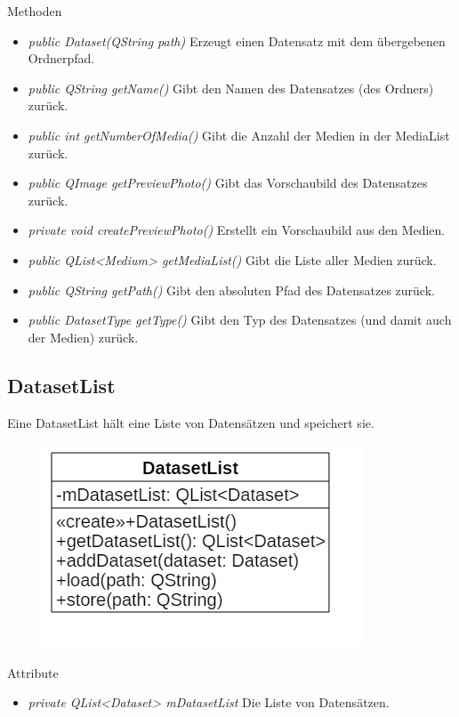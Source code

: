 Methoden
\begin{itemize}
\item \textit{public Dataset(QString path)} Erzeugt einen Datensatz mit dem übergebenen Ordnerpfad.
\item \textit{public QString getName()} Gibt den Namen des Datensatzes (des Ordners) zurück.
\item \textit{public int getNumberOfMedia()} Gibt die Anzahl der Medien in der MediaList zurück.
\item \textit{public QImage getPreviewPhoto()} Gibt das Vorschaubild des Datensatzes zurück.
\item \textit{private void createPreviewPhoto()} Erstellt ein Vorschaubild aus den Medien.
\item \textit{public QList<Medium> getMediaList()} Gibt die Liste aller Medien zurück.
\item \textit{public QString getPath()} Gibt den absoluten Pfad des Datensatzes zurück.
\item \textit{public DatasetType getType()} Gibt den Typ des Datensatzes (und damit auch der Medien) zurück.
\end{itemize}

\subsection*{DatasetList}
Eine DatasetList hält eine Liste von Datensätzen und speichert sie.

\begin{figure}[H]
\centering
\includegraphics[scale=0.5]{img/Klassendiagramm/Klassen/Model/DatasetList}
\label{fig:datasetList}
\end{figure}

Attribute
\begin{itemize}
\item\textit{private QList<Dataset> mDatasetList} Die Liste von Datensätzen.
\end{itemize}

